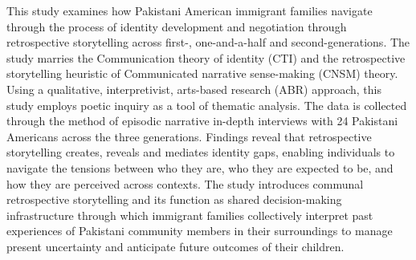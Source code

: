 This study examines how Pakistani American immigrant families navigate through the process of identity development and negotiation through retrospective storytelling across first-, one-and-a-half and second-generations. The study marries the Communication theory of identity (CTI) and the retrospective storytelling heuristic of Communicated narrative sense-making (CNSM) theory. Using a qualitative, interpretivist, arts-based research (ABR) approach, this study employs poetic inquiry as a tool of thematic analysis. The data is collected through the method of episodic narrative in-depth interviews with 24 Pakistani Americans across the three generations. Findings reveal that retrospective storytelling creates, reveals and mediates identity gaps, enabling individuals to navigate the tensions between who they are, who they are expected to be, and how they are perceived across contexts. The study introduces communal retrospective storytelling and its function as shared decision-making infrastructure through which immigrant families collectively interpret past experiences of Pakistani community members in their surroundings to manage present uncertainty and anticipate future outcomes of their children.